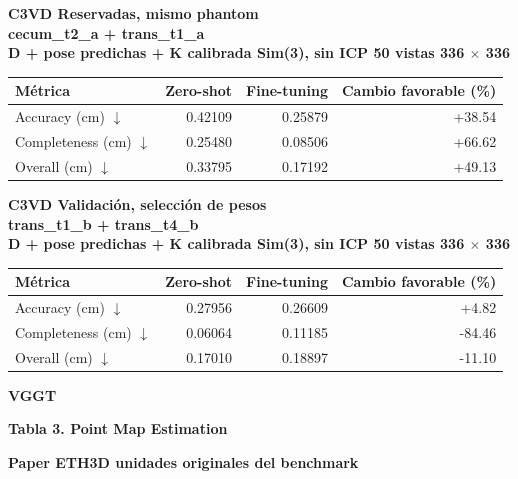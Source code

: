 \documentclass[10pt,a4paper]{article}
\begin{document}
\endgroup
\vspace{6mm}
{\small\bfseries C3VD \textperiodcentered{} Reservadas, mismo phantom\\cecum\_t2\_a + trans\_t1\_a\\D + pose predichas + K calibrada \textperiodcentered{} Sim(3), sin ICP \textperiodcentered{} 50 vistas \textperiodcentered{} 336 \(\times\) 336}\par
\vspace{2mm}
\begingroup\small
\begin{tabularx}{\textwidth}{@{}LRRR@{}}
\toprule
\textbf{Métrica} & \textbf{Zero-shot} & \textbf{Fine-tuning} & \textbf{Cambio favorable (\%)} \\
\midrule
Accuracy (cm) \(\downarrow\) & 0.42109 & 0.25879 & +38.54 \\
Completeness (cm) \(\downarrow\) & 0.25480 & 0.08506 & +66.62 \\
Overall (cm) \(\downarrow\) & 0.33795 & 0.17192 & +49.13 \\
\bottomrule
\end{tabularx}
\endgroup
\vspace{6mm}
{\small\bfseries C3VD \textperiodcentered{} Validación, selección de pesos\\trans\_t1\_b + trans\_t4\_b\\D + pose predichas + K calibrada \textperiodcentered{} Sim(3), sin ICP \textperiodcentered{} 50 vistas \textperiodcentered{} 336 \(\times\) 336}\par
\vspace{2mm}
\begingroup\small
\begin{tabularx}{\textwidth}{@{}LRRR@{}}
\toprule
\textbf{Métrica} & \textbf{Zero-shot} & \textbf{Fine-tuning} & \textbf{Cambio favorable (\%)} \\
\midrule
Accuracy (cm) \(\downarrow\) & 0.27956 & 0.26609 & +4.82 \\
Completeness (cm) \(\downarrow\) & 0.06064 & 0.11185 & -84.46 \\
Overall (cm) \(\downarrow\) & 0.17010 & 0.18897 & -11.10 \\
\bottomrule
\end{tabularx}
\endgroup
\vspace{6mm}
\clearpage
{\Large\bfseries\color{header} VGGT}\par
\vspace{5mm}
{\large\bfseries Tabla 3. Point Map Estimation}\par
\vspace{4mm}
{\small\bfseries Paper \textperiodcentered{} ETH3D \textperiodcentered{} unidades originales del benchmark}\par
\end{document}
